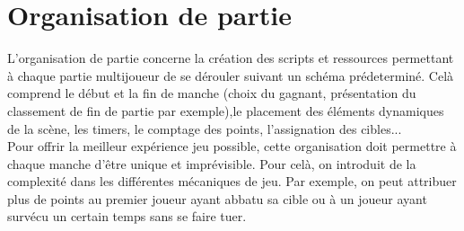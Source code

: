 \documentclass[../doc.tex]{subfiles}
\begin{document}
\section{Organisation de partie}
L'organisation de partie concerne la création des scripts
et ressources permettant à chaque partie multijoueur de se dérouler suivant un schéma prédeterminé. Celà comprend le début et 
la fin de manche (choix du gagnant, présentation du classement
de fin de partie par exemple),le placement des éléments dynamiques de la scène,
les timers, le comptage des points, l'assignation des cibles...
\\

\indent
Pour offrir la meilleur expérience jeu possible, cette organisation
doit permettre à chaque manche d'être unique et imprévisible.
Pour celà, on introduit de la complexité dans les différentes
mécaniques de jeu. Par exemple, on peut attribuer plus de points
au premier joueur ayant abbatu sa cible ou à un joueur ayant
survécu un certain temps sans se faire tuer.
\end{document}
